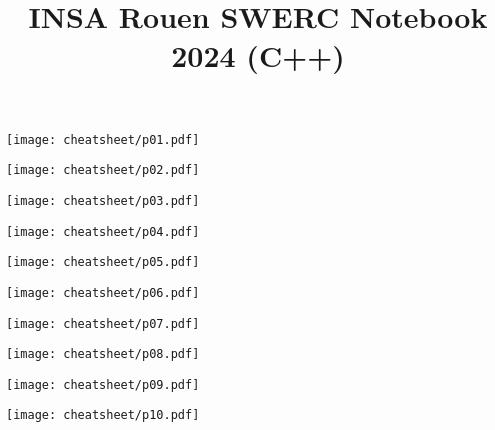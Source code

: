 \documentclass[10pt]{article}
\title{\vspace{-4ex}\Large{INSA Rouen SWERC Notebook 2024 (C++)}}
\author{}
\date{}
\begin{document}
\begin{landscape}
\begin{multicols}{2}

\maketitle
\vspace{-13ex}
\tableofcontents
\pagestyle{fancy}



\end{multicols}
\end{landscape}

\centerline{\texttt{[image: cheatsheet/p01.pdf]}}
\centerline{\texttt{[image: cheatsheet/p02.pdf]}}
\centerline{\texttt{[image: cheatsheet/p03.pdf]}}
\centerline{\texttt{[image: cheatsheet/p04.pdf]}}
\centerline{\texttt{[image: cheatsheet/p05.pdf]}}
\centerline{\texttt{[image: cheatsheet/p06.pdf]}}
\centerline{\texttt{[image: cheatsheet/p07.pdf]}}
\centerline{\texttt{[image: cheatsheet/p08.pdf]}}
\centerline{\texttt{[image: cheatsheet/p09.pdf]}}
\centerline{\texttt{[image: cheatsheet/p10.pdf]}}

\newpage
\null
\newpage
\null
\newpage
\null
\end{document}
